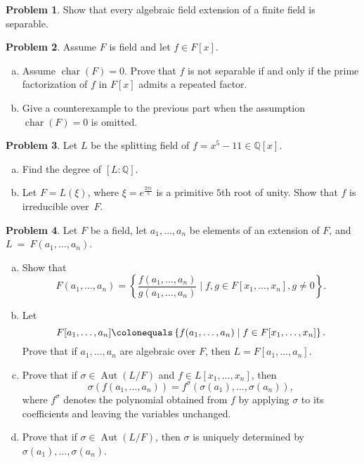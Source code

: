 \documentclass[11pt]{article}
\DeclareMathOperator{\ch}{char}
\DeclareMathOperator{\Aut}{Aut}
\newcommand{\Q}{\mathbb{Q}}
\theoremstyle{definition}
\newtheorem{problem}{Problem}
\begin{document}
\begin{problem}
Show that every algebraic field extension of a finite field is separable.	
\end{problem}


\begin{problem}
Assume $F$ is field and let $f \in F[x]$.
\begin{enumerate}[a)]
\item Assume $\ch(F) = 0$. Prove that $f$ is not separable if and only if the prime factorization of $f$ in $F[x]$ admits a repeated factor.

\item Give a counterexample to the previous part when the assumption $\ch(F) = 0$ is omitted.
\end{enumerate}
\end{problem}




\begin{problem}
	Let $L$ be the splitting field of $f = x^5 - 11 \in \Q[x]$.
	\begin{enumerate}[a)]
		\item Find the degree of $[L : \Q]$.
		\item Let $F = L(\xi)$, where $\xi = e^{\frac{2 \pi i}{5}}$ is a primitive $5$th root of unity. Show that $f$ is irreducible over~$F$.
	\end{enumerate}
\end{problem}


\begin{problem}
Let $F$ be a field, let $a_1,\ldots, a_n$ be elements of an extension of $F$, and $L~=~F(a_1, \ldots, a_n)$.

\begin{enumerate}[a)]
\item Show that
$$F(a_1,\ldots,a_n) = \left\{\frac{f(a_1,\ldots, a_n)}{g(a_1,\ldots,a_n)}\mid f,g \in F[x_1,\ldots, x_n], g \neq 0\right\}.$$

\item Let 
$$F[a_1,\ldots,a_n] \colonequals \left\{f(a_1,\ldots, a_n)\mid f \in F[x_1,\ldots, x_n]\right\}.$$ 
Prove that if $a_1,\ldots, a_n$ are algebraic over $F$, then $L=F[a_1,\ldots,a_n]$.

\item Prove that if $\sigma\in\Aut(L/F)$ and $f\in L[x_1, \ldots, x_n]$, then 
$$\sigma(f(a_1,\ldots, a_n)) = f^\sigma(\sigma(a_1),\ldots, \sigma(a_n)),$$
where $f^\sigma$ denotes the polynomial obtained from $f$ by applying $\sigma$ to its coefficients and leaving the variables unchanged.

\item Prove that if $\sigma \in \Aut(L/F)$, then $\sigma$ is uniquely determined by $\sigma(a_1),\ldots, \sigma(a_n)$.
\end{enumerate}
\end{problem}
\end{document}

